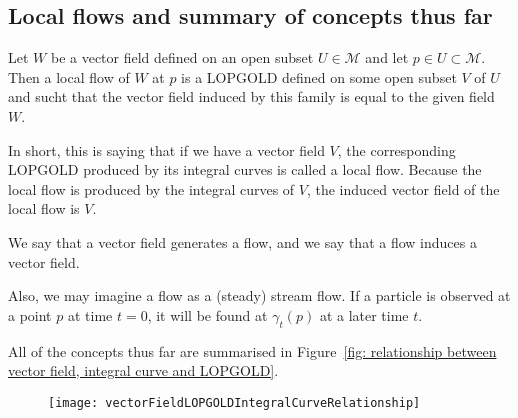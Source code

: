     \subsection{Local flows and summary of concepts thus far}
    \begin{definition}
      Let $W$ be a vector field defined on an open subset $U \in \mathcal{M}$
      and let $p \in U \subset \mathcal{M}$. Then a local flow of $W$ at $p$
      is a LOPGOLD defined on some open subset $V$ of $U$ and sucht that the
      vector field induced by this family is equal to the given field $W$.
    \end{definition}
    \begin{remark}
      In short, this is saying that if we have a vector field $V$, the
      corresponding LOPGOLD produced by its integral curves is called a local
      flow. Because the local flow is produced by the integral curves of $V$,
      the induced vector field of the local flow is $V$.

      We say that a vector field generates a flow, and we say that a flow
      induces a vector field.

      Also, we may imagine a flow as a (steady) stream flow. If a particle is
      observed at a point $p$ at time $t = 0$, it will be found at
      $\gamma_t(p)$ at a later time $t$.
    \end{remark}
    All of the concepts thus far are summarised in Figure~\ref{fig:
    relationship between vector field, integral curve and LOPGOLD}.
    \begin{figure}[h]
      \centering
      \texttt{[image: vectorFieldLOPGOLDIntegralCurveRelationship]}
      \caption[]{}
      \label{fig: relationship between vector field, integral curve and LOPGOLD}
    \end{figure}
